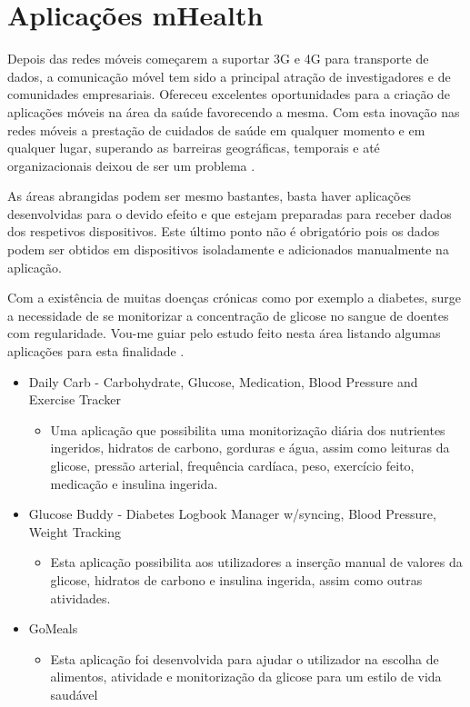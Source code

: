 \section{Aplica\c c\~oes mHealth}

Depois das redes m\'oveis come\c carem a suportar 3G e 4G para transporte de dados, a comunica\c c\~ao m\'ovel tem sido a  principal atra\c c\~ao de investigadores e de comunidades empresariais. Ofereceu excelentes oportunidades para a cria\c c\~ao de  aplica\c c\~oes m\'oveis na \'area da sa\'ude favorecendo a mesma. Com esta inova\c c\~ao nas redes m\'oveis a presta\c c\~ao de cuidados de sa\'ude em qualquer momento e em qualquer lugar, superando as barreiras geogr\'aficas, temporais e at\'e organizacionais deixou de ser um problema \cite{mhealth}.
\par
As \'areas abrangidas podem ser mesmo bastantes, basta haver aplica\c c\~oes desenvolvidas para o devido efeito e que estejam preparadas para receber dados dos respetivos dispositivos. Este \'ultimo ponto não \'e obrigat\'orio pois os dados podem ser obtidos em dispositivos isoladamente e adicionados manualmente na aplica\c c\~ao. 
\par
Com a exist\^encia de muitas doen\c cas cr\'onicas como por exemplo a diabetes, surge a necessidade de se monitorizar a concentra\c c\~ao de glicose no sangue de doentes com regularidade. Vou-me guiar pelo estudo feito nesta \'area listando algumas aplica\c c\~oes para esta finalidade \cite{mhealth}.

\begin{itemize}
  \item Daily Carb - Carbohydrate, Glucose, Medication, Blood Pressure and Exercise Tracker \cite{mhealth_app1}
  \begin{itemize}
    \item Uma aplica\c c\~ao que possibilita uma monitoriza\c c\~ao di\'aria dos nutrientes ingeridos, hidratos de carbono, gorduras e \'agua, assim como leituras da glicose, press\~ao arterial, frequ\^encia card\'iaca, peso, exerc\'icio feito, medica\c c\~ao e insulina ingerida.
  \end{itemize}
  \item Glucose Buddy - Diabetes Logbook Manager w/syncing, Blood Pressure, Weight Tracking \cite{mhealth_app2}
   \begin{itemize}
    \item Esta aplica\c c\~ao possibilita aos utilizadores a inser\c c\~ao manual de valores da glicose, hidratos de carbono e insulina ingerida, assim como outras atividades.
  \end{itemize}
  \item GoMeals \cite{mhealth_app3}
     \begin{itemize}
    \item Esta aplica\c c\~ao foi desenvolvida para ajudar o utilizador na escolha de alimentos, atividade e monitoriza\c c\~ao da glicose  para um  estilo de vida saud\'avel
  \end{itemize}
\end{itemize}

